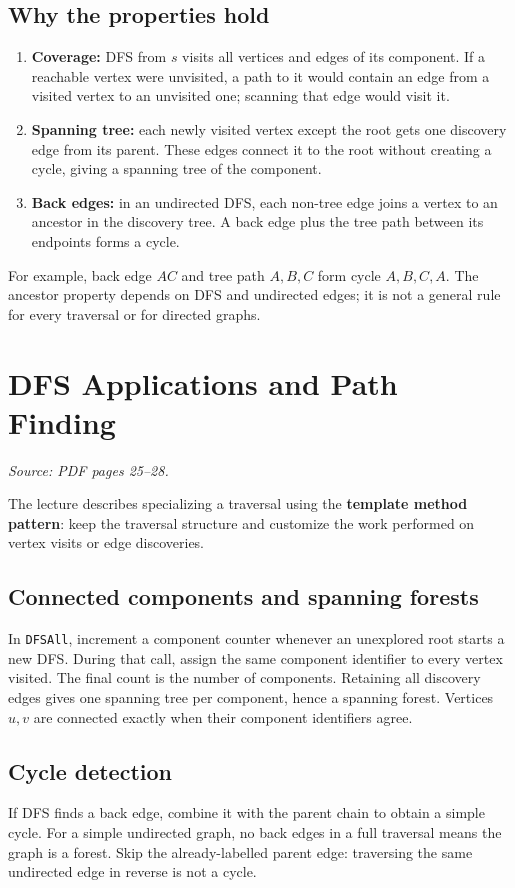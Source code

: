 \documentclass[11pt,letterpaper]{article}
\newcommand{\sourcepages}[1]{\textit{Source: PDF pages #1.}}
\newcommand{\method}[1]{\texttt{#1}}
\begin{document}
\subsection{Why the properties hold}
\begin{enumerate}
    \item \textbf{Coverage:} DFS from $s$ visits all vertices and edges of its component. If a reachable vertex were unvisited, a path to it would contain an edge from a visited vertex to an unvisited one; scanning that edge would visit it.
    \item \textbf{Spanning tree:} each newly visited vertex except the root gets one discovery edge from its parent. These edges connect it to the root without creating a cycle, giving a spanning tree of the component.
    \item \textbf{Back edges:} in an undirected DFS, each non-tree edge joins a vertex to an ancestor in the discovery tree. A back edge plus the tree path between its endpoints forms a cycle.
\end{enumerate}
For example, back edge $AC$ and tree path $A,B,C$ form cycle $A,B,C,A$. The ancestor property depends on DFS and undirected edges; it is not a general rule for every traversal or for directed graphs.

\clearpage
\section{DFS Applications and Path Finding}
\sourcepages{25--28}

The lecture describes specializing a traversal using the \textbf{template method pattern}: keep the traversal structure and customize the work performed on vertex visits or edge discoveries.

\subsection{Connected components and spanning forests}
In \method{DFSAll}, increment a component counter whenever an unexplored root starts a new DFS. During that call, assign the same component identifier to every vertex visited. The final count is the number of components. Retaining all discovery edges gives one spanning tree per component, hence a spanning forest. Vertices $u,v$ are connected exactly when their component identifiers agree.

\subsection{Cycle detection}
If DFS finds a back edge, combine it with the parent chain to obtain a simple cycle. For a simple undirected graph, no back edges in a full traversal means the graph is a forest. Skip the already-labelled parent edge: traversing the same undirected edge in reverse is not a cycle.
\end{document}
